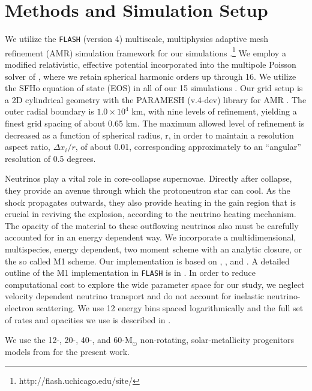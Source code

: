 \documentclass[twocolumn,times]{aastex62}  %
\newcommand{\Msun}{\ensuremath{\mathrm{M}_\odot}\xspace}
\begin{document}
\section{Methods and Simulation Setup}
\label{sec:method}
We utilize the \texttt{FLASH} (version 4) multiscale, multiphysics adaptive mesh refinement (AMR) simulation framework for our simulations \citep{fryxell:2000,dubey:2009}.\footnote{http://flash.uchicago.edu/site/}  We employ a modified relativistic, effective potential \citep{marek:2006, oconnor:2018} incorporated into the multipole Poisson solver of \citet{couch:2013a}, where we retain spherical harmonic orders up through 16.   We utilize the SFHo equation of state (EOS) in all of our 15 simulations \citep{steiner:2013}.  Our grid setup is a 2D cylindrical geometry with the PARAMESH (v.4-dev) library for AMR  \citep{macneice:2000}.  The outer radial boundary is $1.0 \times 10^4$ km, with nine levels of refinement, yielding a finest grid spacing of about 0.65 km.
The maximum allowed level of refinement is decreased as a function of spherical radius, r, in order to maintain a resolution aspect ratio, $\Delta x_i / r$, of about 0.01, corresponding approximately to an ``angular'' resolution of 0.5 degrees.

Neutrinos play a vital role in core-collapse supernovae.  Directly after collapse, they provide an avenue through which the protoneutron star can cool.  As the shock propagates outwards, they also provide heating in the gain region that is crucial in reviving the explosion, according to the neutrino heating mechanism.  The opacity of the material to these outflowing neutrinos also must be carefully accounted for in an energy dependent way.  We incorporate a multidimensional, multispecies, energy dependent, two moment scheme with an analytic closure, or the so called M1 scheme.  Our implementation is based on \citet{oconnor:2015}, \citet{shibata:2011}, and \citet{cardall:2013}.  A detailed outline of the M1 implementation in \texttt{FLASH} is in \citet{oconnor:2018}.  In order to reduce computational cost to explore the wide parameter space for our study, we neglect velocity dependent neutrino transport and do not account for inelastic neutrino-electron scattering.
We use 12 energy bins spaced logarithmically and the full set of rates and opacities we use is described in \citet{oconnor:2017a}. 

We use the 12-, 20-, 40-, and 60-\Msun non-rotating, solar-metallicity progenitors models from \citet{Suk:2016} for the present work.
\end{document}
